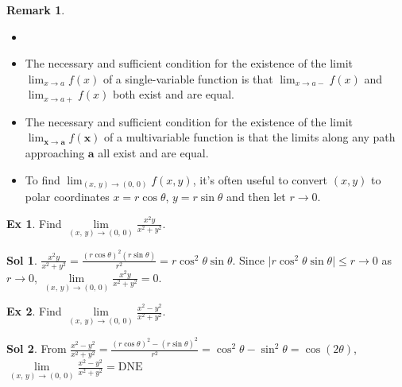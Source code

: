 \documentclass[12pt]{extarticle}
\newcommand{\ds}{\displaystyle}
\theoremstyle{definition}
\newtheorem*{ex}{Ex}
\newtheorem*{sol}{Sol}
\newtheorem*{rmk}{Remark}
\newcommand{\va}{\mathbf{a}}
\newcommand{\vx}{\mathbf{x}}
\begin{document}
\begin{rmk}
  \begin{itemize}\setlength{\itemsep}{0pt}
    \item[]
    \item The necessary and sufficient condition for the existence of the limit $\ds\lim_{x\to a} f(x)$ of a single-variable function is that $\ds\lim_{x\to a-} f(x)$ and $\ds\lim_{x\to a+} f(x)$ both exist and are equal. 
    \item The necessary and sufficient condition for the existence of the limit $\ds\lim_{\vx\to\va} f(\vx)$ of a multivariable function is that {\color{M4}the limits along any path approaching $\va$} all exist and are equal. 
    \item To find $\ds\lim_{(x,\,y)\to(0,\,0)}f(x, y)$, it's often useful to convert $(x,y)$ to polar coordinates $\ds x = r\cos\theta$, $\ds y = r\sin\theta$ and then let $r\to 0$. 
  \end{itemize}

\end{rmk}

\begin{ex}
  Find $\ds\lim\limits_{(x,\,y)\to (0,\,0)}\frac{x^2y}{x^2+y^2}$. 
\end{ex}
\begin{sol}
  $\ds\frac{x^2y}{x^2+y^2} =\frac{(r\cos\theta)^2(r\sin\theta)}{r^2} = r\cos^2\theta\sin\theta$. Since $\ds\big|r\cos^2\theta\sin\theta\big|\leqslant r\to 0$ as $r\to 0$, $\ds\lim\limits_{(x,\,y)\to (0,\,0)}\frac{x^2 y}{x^2 + y^2} = 0$. 
\end{sol}

\begin{ex}
  Find $\ds\lim\limits_{(x,\,y)\to (0,\,0)}\frac{x^2 - y^2}{x^2 + y^2}$. 
\end{ex}
\begin{sol}
  From $\ds\frac{x^2 - y^2}{x^2 + y^2} = \frac{(r\cos\theta)^2 - (r\sin\theta)^2}{r^2} = \cos^2\theta - \sin^2\theta = \cos(2\theta)$, $\ds\lim\limits_{(x,\,y)\to (0,\,0)}\frac{x^2 - y^2}{x^2 + y^2} = \text{DNE}$
\end{sol}
\end{document}
